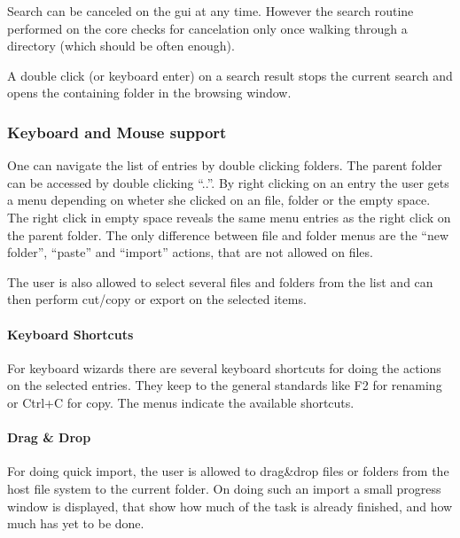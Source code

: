Search can be canceled on the gui at any time. However the search routine performed on the core checks for cancelation only once walking through a directory (which should be often enough).

A double click (or keyboard enter) on a search result stops the current search and opens the containing folder in the browsing window.

\subsubsection{Keyboard and Mouse support}
One can navigate the list of entries by double clicking folders. The parent
folder can be accessed by double clicking ``..''. By right clicking on an entry
the user gets a menu depending on wheter she clicked on an file, folder or the empty
space. The right click in empty space reveals the same menu entries as the right
click on the parent folder. The only difference between file and folder menus
are the ``new folder'', ``paste'' and ``import'' actions, that are not allowed
on files.

The user is also allowed to select several files and folders from the list and
can then perform cut/copy or export on the selected items. 


\paragraph{Keyboard Shortcuts}
For keyboard wizards there are several keyboard shortcuts for doing the actions
on the selected entries. They keep to the general standards like F2 for renaming
or Ctrl+C for copy. The menus indicate the available shortcuts.
\paragraph{Drag \& Drop}
For doing quick import, the user is allowed to drag\&drop files or folders from
the host file system to the current folder. On doing such an import a small
progress window is displayed, that show how much of the task is already
finished, and how much has yet to be done.
